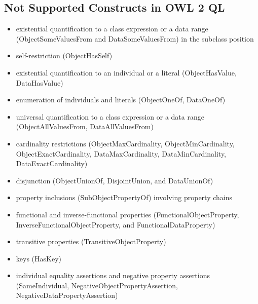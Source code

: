 \documentclass{llncs}
\begin{document}
\subsection{Not Supported Constructs in OWL 2 QL}

\begin{itemize}
	\item existential quantification to a class expression or a data range (ObjectSomeValuesFrom and DataSomeValuesFrom) in the subclass position
  \item self-restriction (ObjectHasSelf)
  \item existential quantification to an individual or a literal (ObjectHasValue, DataHasValue)
  \item enumeration of individuals and literals (ObjectOneOf, DataOneOf)
  \item universal quantification to a class expression or a data range (ObjectAllValuesFrom, DataAllValuesFrom)
  \item cardinality restrictions (ObjectMaxCardinality, ObjectMinCardinality, ObjectExactCardinality, DataMaxCardinality, DataMinCardinality, DataExactCardinality)
  \item disjunction (ObjectUnionOf, DisjointUnion, and DataUnionOf)
  \item property inclusions (SubObjectPropertyOf) involving property chains
  \item functional and inverse-functional properties (FunctionalObjectProperty, InverseFunctionalObjectProperty, and FunctionalDataProperty)
  \item transitive properties (TransitiveObjectProperty)
  \item keys (HasKey)
  \item individual equality assertions and negative property assertions (SameIndividual, NegativeObjectPropertyAssertion, NegativeDataPropertyAssertion)
\end{itemize}



{}

\setcounter{tocdepth}{1}
\end{document}
